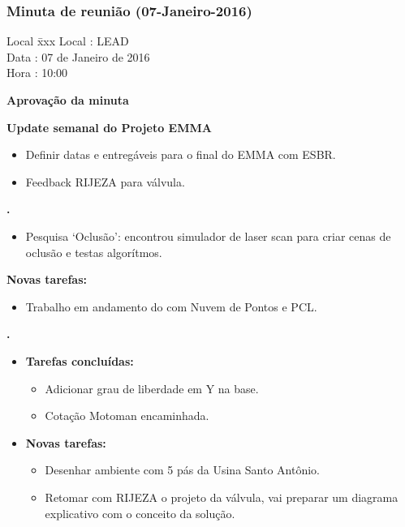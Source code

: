 \subsubsection{Minuta de reunião (07-Janeiro-2016)}

\begin{tabbing}
  Local \= xxx \kill
  Local \> : LEAD \\
  Data  \> : 07 de Janeiro de 2016 \\
  Hora  \> : 10:00
\end{tabbing} 


\textbf{Aprovação da minuta}

\textbf{Update semanal do Projeto EMMA}

\begin{itemize}
			\item Definir datas e entregáveis para o final do EMMA com ESBR.
			\item Feedback RIJEZA para válvula.
			\end{itemize}
   									
						
\textbf{\gabriel.} 
	\begin{itemize}
			\item Pesquisa ‘Oclusão’: encontrou simulador de laser scan para criar cenas
			de oclusão e testas algorítmos.
			\end{itemize}
		
		\item \textbf{Novas tarefas:}
			\begin{itemize} 
				\item Trabalho em andamento do com Nuvem de Pontos e PCL.
			\end{itemize}

					
   \textbf{.} 
	\begin{itemize}
		\item \textbf{Tarefas concluídas:}
			\begin{itemize}    
			    \item Adicionar grau de liberdade em Y na base.
			    \item Cotação Motoman encaminhada.
				
			\end{itemize}
		
		\item \textbf{Novas tarefas:}
			\begin{itemize} 
			    \item Desenhar ambiente com 5 pás da Usina Santo Antônio.
			    \item Retomar com RIJEZA o projeto da válvula, vai preparar um diagrama
			    explicativo com o conceito da solução.
			\end{itemize}
	\end{itemize}

